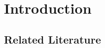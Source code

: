\section{Introduction}\label{sec:introduction}

\subsection{Related Literature}\label{sec:literature}
